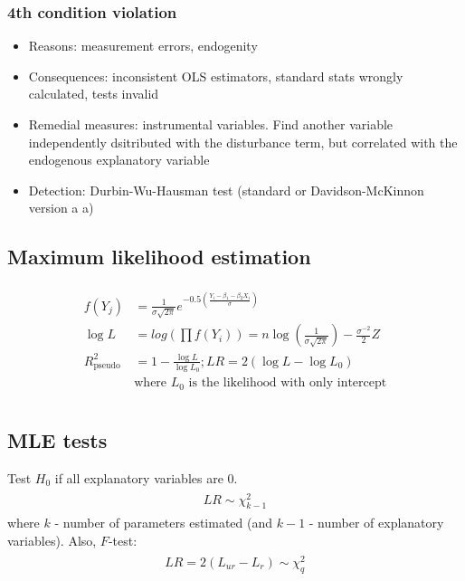 \documentclass{article}
\def\Eq#1{{\begin{gather}\begin{split} #1 \end{split}\end{gather}}}
\begin{document}
\begin{multicols}{2}
\subsubsection*{ 4th condition violation }
\begin{itemize}
\item Reasons: measurement errors, endogenity
\item Consequences: inconsistent OLS estimators, standard stats wrongly calculated, tests invalid
\item Remedial measures: instrumental variables. Find another variable independently dsitributed with the disturbance term, but correlated with the endogenous explanatory variable
\item Detection: Durbin-Wu-Hausman test (standard or Davidson-McKinnon version a a)
\end{itemize}
\end{multicols}

\begin{multicols}{2}
\subsection*{Maximum likelihood estimation}
\Eq{
    f(Y_j) &= \frac{1}{\sigma\sqrt{2 \pi}}e^{-0.5\left(\frac{Y_i - \beta_1 - \beta_2 X_i}{\sigma}\right)} \\
    \log L &= log\left(\prod f(Y_i)\right) = n \log\left(\frac{1}{\sigma \sqrt{2\pi}}\right) - \frac{\sigma^{-2}}{2} Z \\
    R^2_{\text{pseudo}} &= 1 - \frac{\log L}{\log L_0}; LR = 2(\log L - \log L_0) \\
    &\text{where $L_0$ is the likelihood with only intercept} \\
}
\subsection*{MLE tests}
Test $H_0$ if all explanatory variables are 0.
\Eq{
    LR \sim \chi^2_{k-1}
}
where $k$ - number of parameters estimated (and $k - 1$ - number of explanatory variables). Also, $F$-test:
\Eq{
    LR = 2(L_{ur} - L_r) \sim \chi^2_q
}
\end{multicols}
\end{document}
